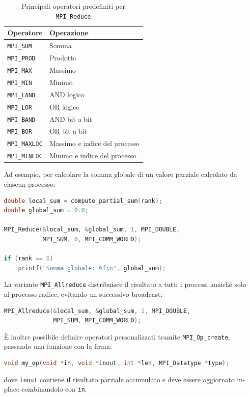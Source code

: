 \begin{table}[h!]
\centering
\caption{Principali operatori predefiniti per \texttt{MPI\_Reduce}}
\label{tab:mpi_op}
\begin{tabular}{ll}
\toprule
Operatore & Operazione \\
\midrule
\texttt{MPI\_SUM}    & Somma \\
\texttt{MPI\_PROD}   & Prodotto \\
\texttt{MPI\_MAX}    & Massimo \\
\texttt{MPI\_MIN}    & Minimo \\
\texttt{MPI\_LAND}   & AND logico \\
\texttt{MPI\_LOR}    & OR logico \\
\texttt{MPI\_BAND}   & AND bit a bit \\
\texttt{MPI\_BOR}    & OR bit a bit \\
\texttt{MPI\_MAXLOC} & Massimo e indice del processo \\
\texttt{MPI\_MINLOC} & Minimo e indice del processo \\
\bottomrule
\end{tabular}
\end{table}

Ad esempio, per calcolare la somma globale di un valore parziale calcolato da ciascun processo:
\begin{lstlisting}[language=C, numbers=none]
double local_sum = compute_partial_sum(rank);
double global_sum = 0.0;

MPI_Reduce(&local_sum, &global_sum, 1, MPI_DOUBLE,
           MPI_SUM, 0, MPI_COMM_WORLD);

if (rank == 0)
    printf("Somma globale: %f\n", global_sum);
\end{lstlisting}
La variante \texttt{MPI\_Allreduce} distribuisce il risultato a tutti i processi anziché solo al processo radice, evitando un successivo broadcast:
\begin{lstlisting}[language=C, numbers=none]
MPI_Allreduce(&local_sum, &global_sum, 1, MPI_DOUBLE,
              MPI_SUM, MPI_COMM_WORLD);
\end{lstlisting}
È inoltre possibile definire operatori personalizzati tramite \texttt{MPI\_Op\_create}, passando una funzione con la firma:
\begin{lstlisting}[language=C, numbers=none]
void my_op(void *in, void *inout, int *len, MPI_Datatype *type);
\end{lstlisting}
dove \texttt{inout} contiene il risultato parziale accumulato e deve essere aggiornato in-place combinandolo con \texttt{in}.

